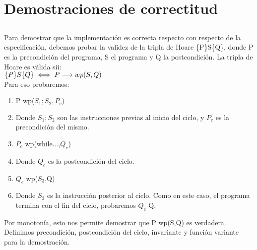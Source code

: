 \documentclass[10pt,a4paper,fleqn]{article}
\begin{document}


\section{Demostraciones de correctitud}
\subsection{}
Para demostrar que la implementación es correcta respecto con respecto de la especificación, debemos probar la validez de la tripla de Hoare  \{P\}S\{Q\}, donde P es la precondición del programa, S el programa y Q la postcondición. La tripla de Hoare es válida sii:\\
$\{P\}S\{Q\} \iff P \longrightarrow wp(S,Q)$\\
Para eso probaremos:
\begin{enumerate}
    \item P \implica wp($S_1;S_2, P_c$)
    \item[] Donde $S_1;S_2$ son las instrucciones previas al inicio del ciclo, y $P_c$ es la precondición del mismo.
    \item $P_c$ \implica wp(while...,$Q_c$)
    \item[] Donde $Q_c$ es la postcondición del ciclo.
    \item $Q_c$ \implica wp($S_3$,Q)
    \item[] Donde $S_3$ es la instrucción posterior al ciclo. Como en este caso, el programa termina con el fin del ciclo, probaremos $Q_c$ \implica Q.
\end{enumerate}
Por monotonía, esto nos permite demostrar que P \implica wp(S,Q) es verdadera. Definimos precondición, postcondición del ciclo, invariante y función variante para la demostración.\\
\end{document}
